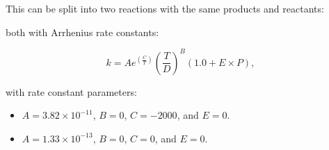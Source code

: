 \documentclass[titlepage]{article}
\begin{document}
This can be split into two reactions with the same products and reactants:
\vspace{20px}


\vspace{20px}

\noindent both with Arrhenius rate constants:

\begin{equation}
k = Ae^{(\frac{C}{T})}(\frac{T}{D})^B(1.0+E \times P),
\end{equation}

\noindent with rate constant parameters:

\begin{itemize}
  \item $A = 3.82 \times 10^{-11}$, $B = 0$, $C = -2000$, and $E = 0$.
  \item $A = 1.33 \times 10^{-13}$, $B = 0$, $C = 0$, and $E = 0$.
\end{itemize}

\end{document}
